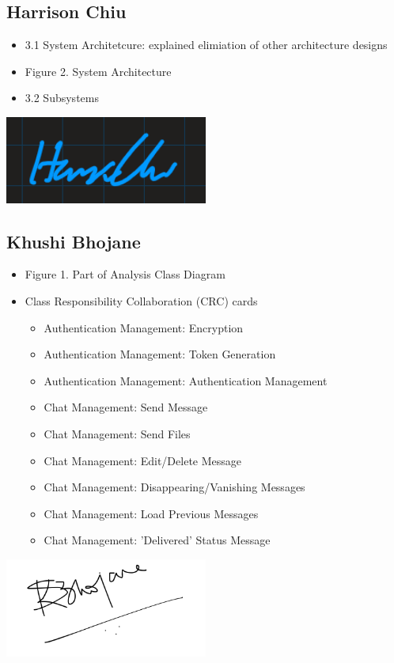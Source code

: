 \documentclass[]{article}
\begin{document}
\subsection{Harrison Chiu}
\label{subsec:harrison_chiu}
\begin{itemize}
	\item 3.1 System Architetcure: explained elimiation of other architecture designs
	\item Figure 2. System Architecture
 	\item 3.2 Subsystems
\end{itemize}
\includegraphics[width=0.5\textwidth]{harrison.png}

\subsection{Khushi Bhojane}
\label{subsec:khushi_bhojane}
\begin{itemize}
	\item Figure 1. Part of Analysis Class Diagram
	\item Class Responsibility Collaboration (CRC) cards
 		\begin{itemize}
   			\item Authentication Management: Encryption
      			\item Authentication Management: Token Generation
	 		\item Authentication Management: Authentication Management
    			\item Chat Management: Send Message
       			\item Chat Management: Send Files
	  		\item Chat Management: Edit/Delete Message
     			\item Chat Management: Disappearing/Vanishing Messages
			\item Chat Management: Load Previous Messages
   			\item Chat Management: 'Delivered' Status Message
      		\end{itemize}
\end{itemize}
\includegraphics[width=0.5\textwidth]{khushi_signature.png}
\end{document}
